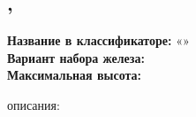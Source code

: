 \begin{samepage}
  \section{\routeTitle, \routeCategory}
  \noindent \textbf{Название в классификаторе:} «\routeName»\\
  \noindent \textbf{Вариант набора железа:} \routeEquipment\\
  \noindent \textbf{Максимальная высота: } 

  \hspace{1em}
\end{samepage}


\routeDescription{}
\nopagebreak[4]
\hfill { описания: \routeAuthors}
